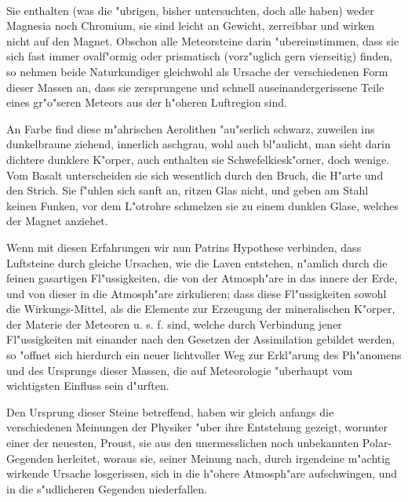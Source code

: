\documentclass[a4paper, 11pt, oneside, polutonikogreek, german]{article}
\begin{document}
\paragraph{}
Sie enthalten (was die "ubrigen, bisher untersuchten, doch alle haben) weder Magnesia noch Chromium, sie sind leicht an Gewicht, zerreibbar und wirken nicht auf den Magnet. Obschon alle Meteorsteine darin "ubereinstimmen, dass sie sich fast immer ovalf"ormig oder prismatisch (vorz"uglich gern vierseitig) finden, so nehmen beide Naturkundiger gleichwohl als Ursache der verschiedenen Form dieser Massen an, dass sie zersprungene und schnell auseinandergerissene Teile eines gr"o"seren Meteors aus der h"oheren Luftregion sind.

An Farbe find diese m"ahrischen Aerolithen "au"serlich schwarz, zuweilen ins dunkelbraune ziehend, innerlich aschgrau, wohl auch bl"aulicht, man sieht darin dichtere dunklere K"orper, auch enthalten sie Schwefelkiesk"orner, doch wenige. Vom Basalt unterscheiden sie sich wesentlich durch den Bruch, die H"arte und den Strich. Sie f"uhlen sich sanft an, ritzen Glas nicht, und geben am Stahl keinen Funken, vor dem L"otrohre schmelzen sie zu einem dunklen Glase, welches der Magnet anziehet.

Wenn mit diesen Erfahrungen wir nun Patrins Hypothese verbinden, dass Luftsteine durch gleiche Ursachen, wie die Laven entstehen, n"amlich durch die feinen gasartigen Fl"ussigkeiten, die von der Atmosph"are in das innere der Erde, und von dieser in die Atmosph"are zirkulieren; dass diese Fl"ussigkeiten sowohl die Wirkungs-Mittel, als die Elemente zur Erzeugung der mineralischen K"orper, der Materie der Meteoren u. s. f. sind, welche durch Verbindung jener Fl"ussigkeiten mit einander nach den Gesetzen der Assimilation gebildet werden, so "offnet sich hierdurch ein neuer lichtvoller Weg zur Erkl"arung des Ph"anomens und des Ursprungs dieser Massen, die auf Meteorologie "uberhaupt vom wichtigsten Einfluss sein d"urften.

Den Ursprung dieser Steine betreffend, haben wir gleich anfangs die verschiedenen Meinungen der Physiker "uber ihre Entstehung gezeigt, worunter einer der neuesten, Proust, sie aus den unermesslichen noch unbekannten Polar-Gegenden herleitet, woraus sie, seiner Meinung nach, durch irgendeine m"achtig wirkende Ursache losgerissen, sich in die h"ohere Atmosph"are aufschwingen, und in die s"udlicheren Gegenden niederfallen.
\end{document}
